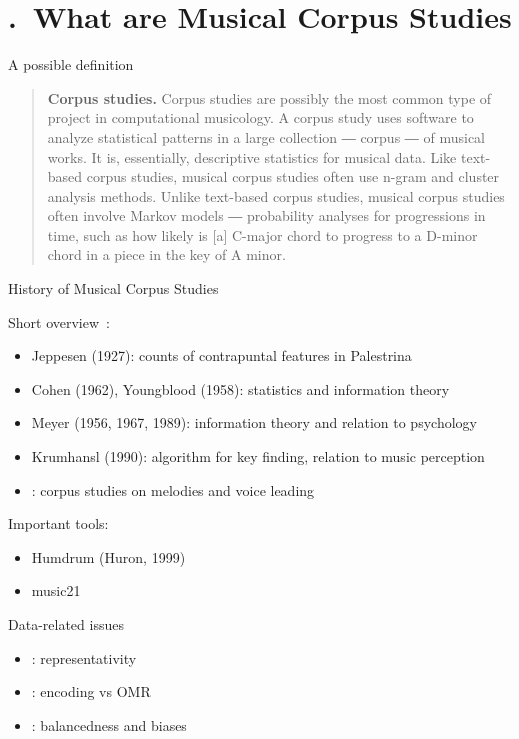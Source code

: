 \section{\thesection.~What are Musical Corpus Studies}

\begin{frame}{A possible definition}
    \begin{quote}
        \textbf{Corpus studies.} Corpus studies are possibly the most common type of project in
        \alert{computational musicology}. A corpus study uses \alert{software} to analyze \alert{statistical patterns}
        in a large collection ― corpus ― of \alert{musical works}. It is, essentially, descriptive statistics
        for musical data. Like text-based corpus studies, musical corpus studies 
        often use \alert{n-gram} and \alert{cluster analysis} methods. 
        Unlike text-based corpus studies, musical corpus
        studies often involve \alert{Markov models} ― probability analyses for progressions in time,
        such as how likely is [a] C-major chord to progress to a D-minor chord in a piece in the
        key of A minor.~\citep{Schaffer2016}
    \end{quote}
\end{frame}

\begin{frame}{History of Musical Corpus Studies}

    Short overview~\citep[after][]{Temperley2013a}:
    \begin{itemize}
        \item Jeppesen (1927): counts of contrapuntal features in Palestrina
        \item Cohen (1962), Youngblood (1958): statistics and information theory 
        \item Meyer (1956, 1967, 1989): information theory and relation to psychology
        \item Krumhansl (1990): algorithm for key finding, relation to music perception
        \item \citet{Huron2001,Huron2006,Huron2016}: corpus studies on melodies and voice leading
    \end{itemize}

    \pause

    Important tools:
    \begin{itemize}
        \item Humdrum (Huron, 1999)
        \item music21 \citep{Cuthbert2010}
    \end{itemize}
\end{frame}

\begin{frame}{Data-related issues}

    \begin{itemize}
        \item \citet{London2013}: representativity
        \item \citet{Pugin2015}: encoding vs OMR
        \item \citet{Neuwirth2018}: balancedness and biases
    \end{itemize}
    
\end{frame}